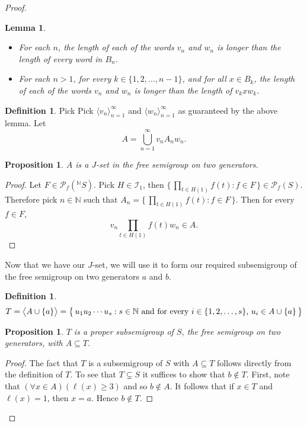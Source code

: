 \documentclass[12pt]{article}
\theoremstyle{plain}
\newtheorem{prop}[thm]{Proposition}
\newtheorem{lem}[thm]{Lemma}
\theoremstyle{definition}
\newtheorem{defn}[thm]{Definition}
\newcommand{\la}{\langle}
\newcommand{\ra}{\rangle}
\begin{document}
\begin{proof}
\begin{lem}
\begin{itemize}
    \item[(2)] For each $n$, the length of each of the words $v_n$ 
      and $w_n$ is longer than the length of every word in $B_n$.

    \item[(3)] For each $n > 1$, for every $k \in \{1, 2, \ldots,
      n-1\}$, and for all $x \in B_k$, the length of each of the 
      words $v_n$ and $w_n$ is longer than the length of 
      $v_kxw_k$.
    \end{itemize}
  \end{lem}

  \begin{defn}\label{jset}
  Pick Pick $\la v_n \ra_{n=1}^\infty$ and $\la w_n \ra_{n=1}^\infty$ as
  guaranteed by the above lemma. 
  Let
  \[ A = \bigcup_{n=1}^\infty v_nA_nw_n. \]
  \end{defn}

  \begin{prop}\label{prop:jset}
  $A$ is a $J$-set in the free semigroup on two generators.
  \end{prop}
  \begin{proof}
  Let $F \in \mathcal{P}_f(^{\mathbb{N}}{\!S})$.
  Pick $H \in \mathcal{I}_1$, then $\{\, \prod_{t \in H(1)} f(t) :
  f \in F \,\} \in \mathcal{P}_f(S)$.
  Therefore pick $n \in \mathbb{N}$ such that $A_n = \{\,
  \prod_{t \in H(1)} f(t) : f \in F \,\}$.
  Then for every $f \in F$,
  \[
  v_n\prod_{t \in H(1)} f(t)w_n \in A.
  \]
  \end{proof}

Now that we have our $J$-set, we will use it to form our 
required subsemigroup of the free semigroup on two generators 
$a$ and $b$.

  \begin{defn}\label{subsgrp}
  \[
  T = \bigl\la A \cup \{a\} \bigr\ra = \bigl\{\,u_1u_2 \cdots u_s : 
  \hbox{$s \in \mathbb{N}$ and for every $i \in \{1, 2, \ldots, s\}$,
  $u_i \in A \cup \{a\}$}\,\bigr\}
  \]
  \end{defn}

  \begin{prop}\label{prop:subsgrp}
  $T$ is a proper subsemigroup of $S$, the free semigroup on two 
  generators, with $A \subseteq T$.
  \end{prop}
  \begin{proof}
  The fact that $T$ is a subsemigroup of $S$ with $A \subseteq T$
  follows directly from the definition of $T$.
  To see that $T \subsetneq S$ it suffices to show that $b \not\in
  T$.
  First, note that $(\forall x \in A)(\ell(x) \ge 3)$ and so
  $b \not\in A$.
  It follows that if $x \in T$ and $\ell(x) = 1$, then $x=a$. 
  Hence $b \not\in T$.
  \end{proof}


\end{proof}
\end{document}
